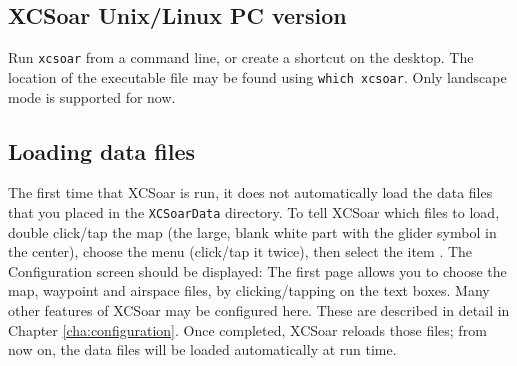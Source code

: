 \subsection*{XCSoar Unix/Linux PC version}
Run \verb|xcsoar| from a command line, or create a shortcut on the
desktop.  The location of the executable file may be found using
\verb|which xcsoar|.  Only landscape mode is  supported for now.

\subsection*{Loading data files}\label{sec:loaddatafiles}
The first time that XCSoar is run, it does not automatically load the 
data files that you placed in the \verb|XCSoarData| directory.  
To tell XCSoar which files to load, double click/tap the map (the large,
blank white part with the glider symbol in the center),
choose the menu  (click/tap it twice), then select the item 
.  The Configuration screen should be displayed:
The first page allows you to choose the map, 
waypoint and airspace files, by clicking/tapping on the text boxes.
Many other features of XCSoar may be configured here. These are described in detail in Chapter
\ref{cha:configuration}.
Once completed, XCSoar reloads those files; from now on, the data files
will be loaded automatically at run time.


